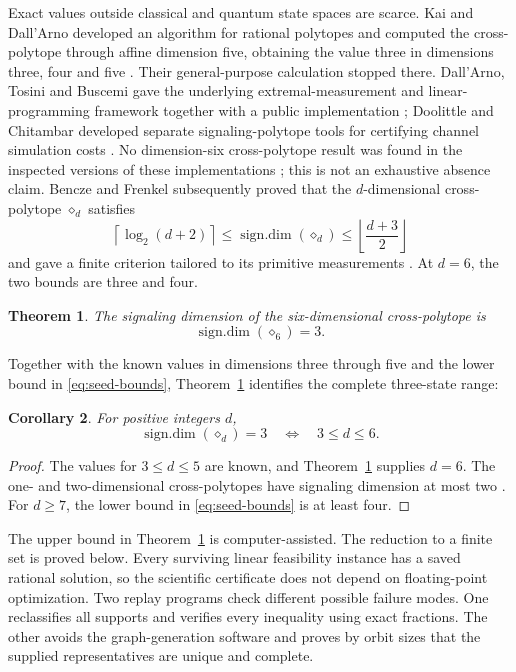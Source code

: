 \documentclass[11pt]{article}
\newtheorem{theorem}{Theorem}[section]
\newtheorem{corollary}[theorem]{Corollary}
\newcommand{\sdim}{\operatorname{sign.dim}}
\begin{document}
Exact values outside classical and quantum state spaces are scarce. Kai and
Dall'Arno developed an algorithm for rational polytopes and computed the
cross-polytope through affine dimension five, obtaining the value three in
dimensions three, four and five \cite{KaiDallArno}. Their general-purpose
calculation stopped there. Dall'Arno, Tosini and Buscemi gave the underlying
extremal-measurement and linear-programming framework together with a public
implementation \cite{DallArnoTosiniBuscemi}; Doolittle and Chitambar developed
separate signaling-polytope tools for certifying channel simulation costs
\cite{DoolittleChitambar}. No dimension-six cross-polytope result was found in
the inspected versions of these implementations \cite{SigdimSoftware,SignalingSoftware}; this is not an exhaustive
absence claim. Bencze and Frenkel subsequently proved that the
$d$-dimensional cross-polytope $\diamond_d$ satisfies
\begin{equation}\label{eq:seed-bounds}
 \left\lceil\log_2(d+2)\right\rceil
 \leq \sdim(\diamond_d)
 \leq \left\lfloor\frac{d+3}{2}\right\rfloor
\end{equation}
and gave a finite criterion tailored to its primitive measurements
\cite{BenczeFrenkel}. At $d=6$, the two bounds are three and four.

\begin{theorem}\label{thm:main}
The signaling dimension of the six-dimensional cross-polytope is
\[
 \sdim(\diamond_6)=3.
\]
\end{theorem}

Together with the known values in dimensions three through five and the lower
bound in \eqref{eq:seed-bounds}, Theorem~\ref{thm:main} identifies the complete
three-state range:
\begin{corollary}\label{cor:boundary}
For positive integers $d$,
\[
 \sdim(\diamond_d)=3 \quad\Longleftrightarrow\quad 3\leq d\leq6.
\]
\end{corollary}
\begin{proof}
The values for $3\leq d\leq5$ are known, and Theorem~\ref{thm:main} supplies
$d=6$. The one- and two-dimensional cross-polytopes have signaling dimension
at most two \cite{KaiDallArno}. For $d\geq7$, the lower bound in
\eqref{eq:seed-bounds} is at least four.
\end{proof}

The upper bound in Theorem~\ref{thm:main} is computer-assisted. The reduction
to a finite set is proved below. Every surviving linear feasibility instance
has a saved rational solution, so the scientific certificate does not depend
on floating-point optimization. Two replay programs check different possible
failure modes. One reclassifies all supports and verifies every inequality
using exact fractions. The other avoids the graph-generation software and
proves by orbit sizes that the supplied representatives are unique and
complete.
\end{document}

